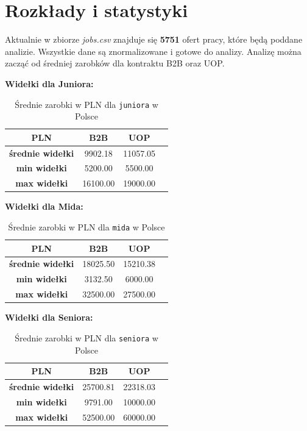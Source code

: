 \documentclass[a4paper]{article}
\begin{document}
\newpage

\section{Rozkłady i statystyki}

\quad Aktualnie w zbiorze \textit{jobs.csv} znajduje się \textbf{5751} ofert pracy, które będą poddane
analizie. Wszystkie dane są znormalizowane i gotowe do analizy. Analizę można zacząć od średniej zarobków
dla kontraktu B2B oraz UOP.


\textbf{Widełki dla Juniora: }

\begin{table}[H]
    \centering
    \begin{tabular}{|c|c|c|c|}
        \hline
        \textbf{PLN}             & \textbf{B2B} & \textbf{UOP} \\ \hline
        \textbf{średnie widełki} & 9902.18      & 11057.05     \\ \hline
        \textbf{min widełki}     & 5200.00      & 5500.00      \\ \hline
        \textbf{max widełki}     & 16100.00     & 19000.00     \\ \hline
    \end{tabular}
    \caption{Średnie zarobki w PLN dla \texttt{juniora} w Polsce}
\end{table}

\textbf{Widełki dla Mida: }

\begin{table}[H]
    \centering
    \begin{tabular}{|c|c|c|c|}
        \hline
        \textbf{PLN}             & \textbf{B2B} & \textbf{UOP} \\ \hline
        \textbf{średnie widełki} & 18025.50     & 15210.38     \\ \hline
        \textbf{min widełki}     & 3132.50      & 6000.00      \\ \hline
        \textbf{max widełki}     & 32500.00     & 27500.00     \\ \hline
    \end{tabular}
    \caption{Średnie zarobki w PLN dla \texttt{mida} w Polsce}
\end{table}

\textbf{Widełki dla Seniora: }

\begin{table}[H]
    \centering
    \begin{tabular}{|c|c|c|c|}
        \hline
        \textbf{PLN}             & \textbf{B2B} & \textbf{UOP} \\ \hline
        \textbf{średnie widełki} & 25700.81     & 22318.03     \\ \hline
        \textbf{min widełki}     & 9791.00      & 10000.00     \\ \hline
        \textbf{max widełki}     & 52500.00     & 60000.00     \\ \hline
    \end{tabular}
    \caption{Średnie zarobki w PLN dla \texttt{seniora} w Polsce}
\end{table}
\end{document}
